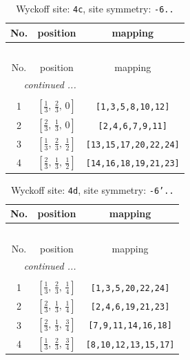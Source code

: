 \documentclass[fleqn,8pt]{jsarticle}
\begin{document}
\renewcommand{\arraystretch}{1.2}
\begin{longtable}{ccc}
\caption{Wyckoff site: {\tt 4c}, site symmetry: {\tt -6..}}
 \\
 \hline \hline
No. & position & mapping \\ \hline \endfirsthead

\multicolumn{2}{l}{\tablename\ \thetable{}} \\
 \hline \hline
No. & position & mapping \\ \hline \endhead

 \hline \hline
\multicolumn{2}{r}{\footnotesize\it continued ...} \\ \endfoot

 \hline \hline
\multicolumn{2}{r}{} \\ \endlastfoot

1 & $\left[ \frac{1}{3},\, \frac{2}{3},\, 0 \right]$ & {\tt [1,3,5,8,10,12]} \\ \hline
2 & $\left[ \frac{2}{3},\, \frac{1}{3},\, 0 \right]$ & {\tt [2,4,6,7,9,11]} \\ \hline
3 & $\left[ \frac{1}{3},\, \frac{2}{3},\, \frac{1}{2} \right]$ & {\tt [13,15,17,20,22,24]} \\ \hline
4 & $\left[ \frac{2}{3},\, \frac{1}{3},\, \frac{1}{2} \right]$ & {\tt [14,16,18,19,21,23]} \\
\end{longtable}
\renewcommand{\arraystretch}{1.2}
\begin{longtable}{ccc}
\caption{Wyckoff site: {\tt 4d}, site symmetry: {\tt -6'..}}
 \\
 \hline \hline
No. & position & mapping \\ \hline \endfirsthead

\multicolumn{2}{l}{\tablename\ \thetable{}} \\
 \hline \hline
No. & position & mapping \\ \hline \endhead

 \hline \hline
\multicolumn{2}{r}{\footnotesize\it continued ...} \\ \endfoot

 \hline \hline
\multicolumn{2}{r}{} \\ \endlastfoot

1 & $\left[ \frac{1}{3},\, \frac{2}{3},\, \frac{1}{4} \right]$ & {\tt [1,3,5,20,22,24]} \\ \hline
2 & $\left[ \frac{2}{3},\, \frac{1}{3},\, \frac{1}{4} \right]$ & {\tt [2,4,6,19,21,23]} \\ \hline
3 & $\left[ \frac{2}{3},\, \frac{1}{3},\, \frac{3}{4} \right]$ & {\tt [7,9,11,14,16,18]} \\ \hline
4 & $\left[ \frac{1}{3},\, \frac{2}{3},\, \frac{3}{4} \right]$ & {\tt [8,10,12,13,15,17]} \\
\end{longtable}
\end{document}
